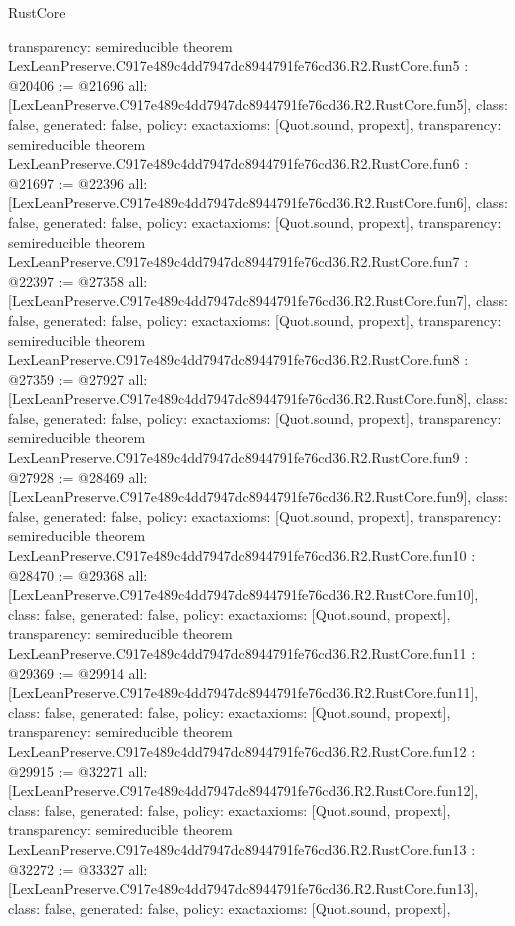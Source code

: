 \begin{lexlean}{RustCore}
\begin{coremodule}
{  transparency: semireducible
}
theorem LexLeanPreserve.C917e489c4dd7947dc8944791fe76cd36.R2.RustCore.fun5 : @20406 := @21696 {
  all: [LexLeanPreserve.C917e489c4dd7947dc8944791fe76cd36.R2.RustCore.fun5],
  class: false,
  generated: false,
  policy: exact{axioms: [Quot.sound, propext]},
  transparency: semireducible
}
theorem LexLeanPreserve.C917e489c4dd7947dc8944791fe76cd36.R2.RustCore.fun6 : @21697 := @22396 {
  all: [LexLeanPreserve.C917e489c4dd7947dc8944791fe76cd36.R2.RustCore.fun6],
  class: false,
  generated: false,
  policy: exact{axioms: [Quot.sound, propext]},
  transparency: semireducible
}
theorem LexLeanPreserve.C917e489c4dd7947dc8944791fe76cd36.R2.RustCore.fun7 : @22397 := @27358 {
  all: [LexLeanPreserve.C917e489c4dd7947dc8944791fe76cd36.R2.RustCore.fun7],
  class: false,
  generated: false,
  policy: exact{axioms: [Quot.sound, propext]},
  transparency: semireducible
}
theorem LexLeanPreserve.C917e489c4dd7947dc8944791fe76cd36.R2.RustCore.fun8 : @27359 := @27927 {
  all: [LexLeanPreserve.C917e489c4dd7947dc8944791fe76cd36.R2.RustCore.fun8],
  class: false,
  generated: false,
  policy: exact{axioms: [Quot.sound, propext]},
  transparency: semireducible
}
theorem LexLeanPreserve.C917e489c4dd7947dc8944791fe76cd36.R2.RustCore.fun9 : @27928 := @28469 {
  all: [LexLeanPreserve.C917e489c4dd7947dc8944791fe76cd36.R2.RustCore.fun9],
  class: false,
  generated: false,
  policy: exact{axioms: [Quot.sound, propext]},
  transparency: semireducible
}
theorem LexLeanPreserve.C917e489c4dd7947dc8944791fe76cd36.R2.RustCore.fun10 : @28470 := @29368 {
  all: [LexLeanPreserve.C917e489c4dd7947dc8944791fe76cd36.R2.RustCore.fun10],
  class: false,
  generated: false,
  policy: exact{axioms: [Quot.sound, propext]},
  transparency: semireducible
}
theorem LexLeanPreserve.C917e489c4dd7947dc8944791fe76cd36.R2.RustCore.fun11 : @29369 := @29914 {
  all: [LexLeanPreserve.C917e489c4dd7947dc8944791fe76cd36.R2.RustCore.fun11],
  class: false,
  generated: false,
  policy: exact{axioms: [Quot.sound, propext]},
  transparency: semireducible
}
theorem LexLeanPreserve.C917e489c4dd7947dc8944791fe76cd36.R2.RustCore.fun12 : @29915 := @32271 {
  all: [LexLeanPreserve.C917e489c4dd7947dc8944791fe76cd36.R2.RustCore.fun12],
  class: false,
  generated: false,
  policy: exact{axioms: [Quot.sound, propext]},
  transparency: semireducible
}
theorem LexLeanPreserve.C917e489c4dd7947dc8944791fe76cd36.R2.RustCore.fun13 : @32272 := @33327 {
  all: [LexLeanPreserve.C917e489c4dd7947dc8944791fe76cd36.R2.RustCore.fun13],
  class: false,
  generated: false,
  policy: exact{axioms: [Quot.sound, propext]},
}
\end{coremodule}
\end{lexlean}
